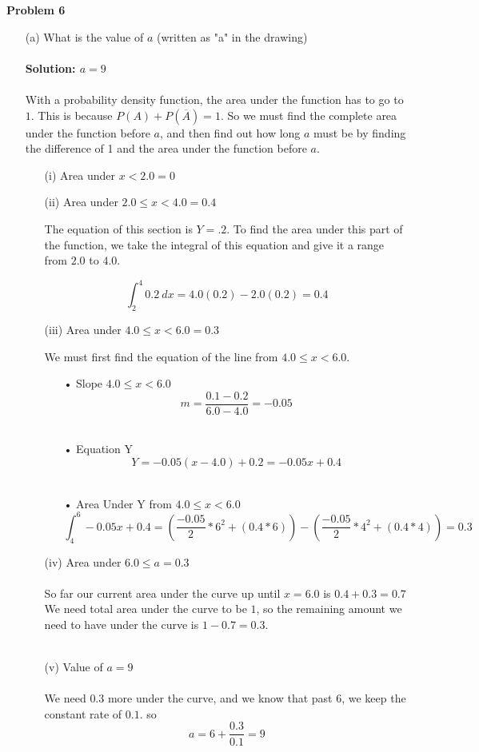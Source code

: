 \documentclass[11pt]{article}
\begin{document}
\newpage
\textbf{Problem 6}
\begin{enumerate}
\item[(a)] What is the value of $a$ (written as "a" in the drawing) 
\\ \\
\textbf{Solution: $a = 9$}
\\ \\
With a probability density function, the area under the function has to go to $1$.  This is because $P(A) + P(\overline{A}) = 1$.  So we must find the complete area under the function before $a$, and then find out how long $a$ must be by finding the difference of 1 and the area under the function before $a$.
\\
\begin{itemize}
\item[(i)] Area under $x < 2.0 = 0$
\item[(ii)] Area under $2.0 \leq x < 4.0 = 0.4$
\begin{center}
The equation of this section is $Y = .2$.   To find the area under this part of the function, we take the integral of this equation and give it a range from $2.0$ to $4.0$.
\end{center}
$$ \int_2^4 0.2\ dx = 4.0(0.2) - 2.0(0.2) = 0.4$$
\item[(iii)] Area under $4.0 \leq x < 6.0 = 0.3$
\begin{center}
We must first find the equation of the line from $4.0 \leq x < 6.0$.  
\end{center}
\begin{enumerate}
\vspace{5mm}
\item[•] Slope $4.0 \leq x < 6.0$ 
$$m = \frac{0.1 - 0.2}{6.0 - 4.0} = -0.05$$
\\
\item[•] Equation Y
$$Y = -0.05(x - 4.0) + 0.2 = -0.05x + 0.4$$
\\
\item[•] Area Under Y from $4.0 \leq x < 6.0$
{\Large $$ \int_4^6 -0.05x + 0.4 = (\frac{-0.05}{2}*6^2 + (0.4*6)) - (\frac{-0.05}{2}*4^2 + (0.4*4)) = 0.3$$ }
\end{enumerate}
\item[(iv)]Area under $6.0 \leq a = 0.3$
\\ \\So far our current area under the curve up until $x = 6.0$ is $0.4 + 0.3 = 0.7$ We need total  area under the curve to be $1$, so the remaining amount we need to have under the curve is $1 - 0.7 = 0.3$.\\ \\
\item[(v)] Value of $a = 9$
\\ \\
We need $0.3$ more under the curve, and we know that past $6$, we keep the constant rate of $0.1$. so $$a = 6 + \frac{0.3}{0.1} = 9$$


\end{itemize}
\end{enumerate}
\end{document}
